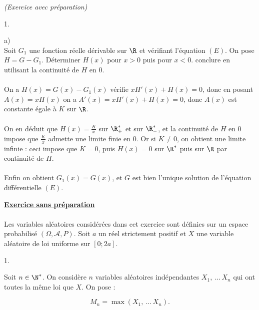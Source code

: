 \documentclass[11pt]{article}%
\begin{document}
\begin{exercice}{\it (Exercice avec préparation)}
\begin{noliste}{1.}
\begin{noliste}{a)}
\[\]
 Soit $G_{1}$ une fonction réelle dérivable sur $\R$ et vérifiant
l'équation $(E)$. On pose $H = G - G_{1}$. Déterminer $H(x)$ pour $x >
0$ puis pour $x < 0$. conclure en utilisant la continuité de $H$ en 0.
\\
\\
 On a $H(x) = G (x) - G_{1} (x)$ vérifie $x H'(x) + H(x) = 0$, donc en
posant $A(x) = x H(x)$ on a $ A'(x) = x H'(x) + H(x) = 0$, donc $A(x)$
est constante égale à $K$ sur $\R$. \\
\\
 On en déduit que $H(x) = \frac{K}{x}$ sur $\R_+^*$ et sur $\R_-^*$, et
la continuité de $H$ en 0 impose que $\frac{K}{x}$ admette une limite
finie en 0. Or si $K \neq 0$, on obtient une limite infinie : ceci
impose que $K = 0$, puis $H(x) = 0$ sur $\R^*$ puis sur $\R$ par
continuité de $H$. \\
\\
 Enfin on obtient $G_{1} (x) = G(x)$, et $G$ est bien l'unique solution
de l'équation différentielle $(E)$. \\
 \end{noliste} 
 \end{noliste}
 \noindent \textbf{\underline{Exercice sans préparation}} \\
\\
 Les variables aléatoires considérées dans cet exercice sont définies
sur un espace probabilisé $(\Omega, \mathcal{A}, P)$. Soit $a$ un réel
strictement positif et $X$ une variable aléatoire de loi uniforme sur
$[0 ; 2a]$. \begin{noliste}{1.}
 \setlength{\itemsep}{4mm}
 \item Soit $n \in \N^*$. On considère $n$ variables aléatoires
indépendantes $X_{1},\ \dots\, X_{n}$ qui ont toutes la même loi que
$X$. On pose : 
 
\[
 M_{n} = \max ( X_{1},\ \dots\, X_{n}). 
 
\]
\end{noliste}
\end{exercice}
\end{document}
